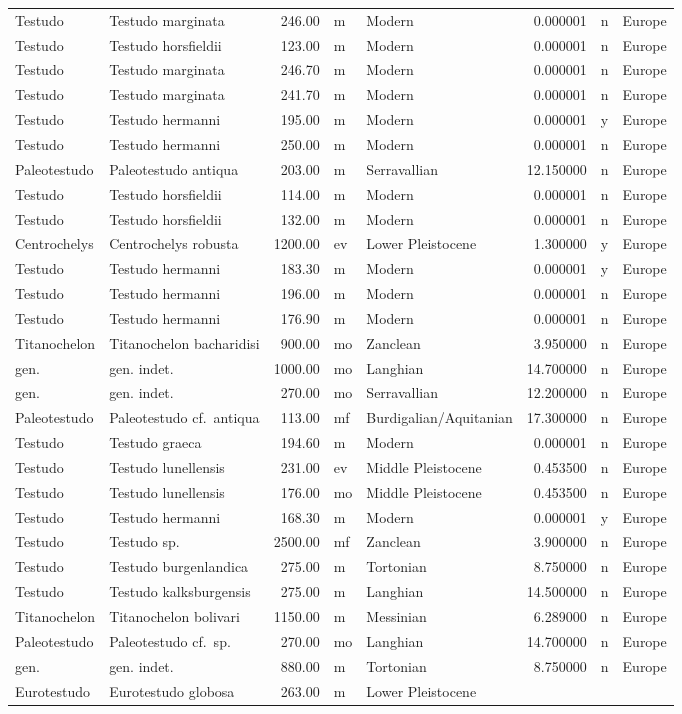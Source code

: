 \begin{landscape}
\begin{longtable}[]{@{}llrllrll@{}}
	Testudo & Testudo marginata & 246.00 & m & Modern & 0.000001 & n &
	Europe\tabularnewline
	Testudo & Testudo horsfieldii & 123.00 & m & Modern & 0.000001 & n &
	Europe\tabularnewline
	Testudo & Testudo marginata & 246.70 & m & Modern & 0.000001 & n &
	Europe\tabularnewline
	Testudo & Testudo marginata & 241.70 & m & Modern & 0.000001 & n &
	Europe\tabularnewline
	Testudo & Testudo hermanni & 195.00 & m & Modern & 0.000001 & y &
	Europe\tabularnewline
	Testudo & Testudo hermanni & 250.00 & m & Modern & 0.000001 & n &
	Europe\tabularnewline
	Paleotestudo & Paleotestudo antiqua & 203.00 & m & Serravallian &
	12.150000 & n & Europe\tabularnewline
	Testudo & Testudo horsfieldii & 114.00 & m & Modern & 0.000001 & n &
	Europe\tabularnewline
	Testudo & Testudo horsfieldii & 132.00 & m & Modern & 0.000001 & n &
	Europe\tabularnewline
	Centrochelys & Centrochelys robusta & 1200.00 & ev & Lower Pleistocene &
	1.300000 & y & Europe\tabularnewline
	Testudo & Testudo hermanni & 183.30 & m & Modern & 0.000001 & y &
	Europe\tabularnewline
	Testudo & Testudo hermanni & 196.00 & m & Modern & 0.000001 & n &
	Europe\tabularnewline
	Testudo & Testudo hermanni & 176.90 & m & Modern & 0.000001 & n &
	Europe\tabularnewline
	Titanochelon & Titanochelon bacharidisi & 900.00 & mo & Zanclean &
	3.950000 & n & Europe\tabularnewline
	gen. & gen. indet. & 1000.00 & mo & Langhian & 14.700000 & n &
	Europe\tabularnewline
	gen. & gen. indet. & 270.00 & mo & Serravallian & 12.200000 & n &
	Europe\tabularnewline
	Paleotestudo & Paleotestudo cf.~antiqua & 113.00 & mf &
	Burdigalian/Aquitanian & 17.300000 & n & Europe\tabularnewline
	Testudo & Testudo graeca & 194.60 & m & Modern & 0.000001 & n &
	Europe\tabularnewline
	Testudo & Testudo lunellensis & 231.00 & ev & Middle Pleistocene &
	0.453500 & n & Europe\tabularnewline
	Testudo & Testudo lunellensis & 176.00 & mo & Middle Pleistocene &
	0.453500 & n & Europe\tabularnewline
	Testudo & Testudo hermanni & 168.30 & m & Modern & 0.000001 & y &
	Europe\tabularnewline
	Testudo & Testudo sp. & 2500.00 & mf & Zanclean & 3.900000 & n &
	Europe\tabularnewline
	Testudo & Testudo burgenlandica & 275.00 & m & Tortonian & 8.750000 & n
	& Europe\tabularnewline
	Testudo & Testudo kalksburgensis & 275.00 & m & Langhian & 14.500000 & n
	& Europe\tabularnewline
	Titanochelon & Titanochelon bolivari & 1150.00 & m & Messinian &
	6.289000 & n & Europe\tabularnewline
	Paleotestudo & Paleotestudo cf.~sp. & 270.00 & mo & Langhian & 14.700000
	& n & Europe\tabularnewline
	gen. & gen. indet. & 880.00 & m & Tortonian & 8.750000 & n &
	Europe\tabularnewline
	Eurotestudo & Eurotestudo globosa & 263.00 & m & Lower Pleistocene &

\end{longtable}
\end{landscape}
